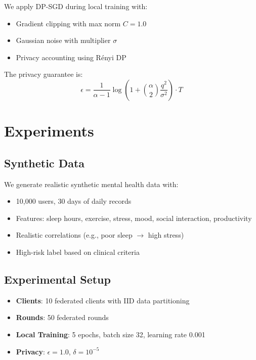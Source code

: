 \documentclass[11pt,a4paper]{article}
\begin{document}
We apply DP-SGD during local training with:
\begin{itemize}
    \item Gradient clipping with max norm $C = 1.0$
    \item Gaussian noise with multiplier $\sigma$
    \item Privacy accounting using Rényi DP
\end{itemize}

The privacy guarantee is:
\begin{equation}
    \epsilon = \frac{1}{\alpha - 1} \log\left(1 + \binom{\alpha}{2}\frac{q^2}{\sigma^2}\right) \cdot T
\end{equation}

\section{Experiments}

\subsection{Synthetic Data}

We generate realistic synthetic mental health data with:
\begin{itemize}
    \item 10,000 users, 30 days of daily records
    \item Features: sleep hours, exercise, stress, mood, social interaction, productivity
    \item Realistic correlations (e.g., poor sleep $\rightarrow$ high stress)
    \item High-risk label based on clinical criteria
\end{itemize}

\subsection{Experimental Setup}

\begin{itemize}
    \item \textbf{Clients}: 10 federated clients with IID data partitioning
    \item \textbf{Rounds}: 50 federated rounds
    \item \textbf{Local Training}: 5 epochs, batch size 32, learning rate 0.001
    \item \textbf{Privacy}: $\epsilon = 1.0$, $\delta = 10^{-5}$
\end{itemize}
\end{document}
